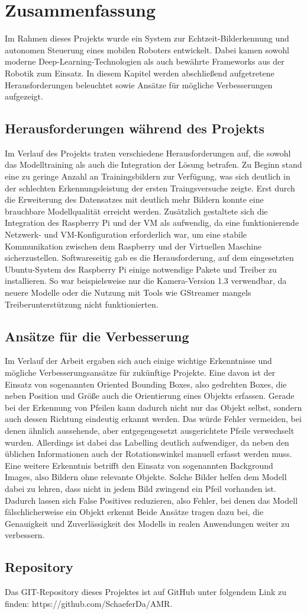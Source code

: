 \section{Zusammenfassung}
Im Rahmen dieses Projekts wurde ein System zur Echtzeit-Bilderkennung und autonomen Steuerung eines mobilen Roboters entwickelt. 
Dabei kamen sowohl moderne Deep-Learning-Technologien als auch bewährte Frameworks aus der Robotik zum Einsatz. 
In diesem Kapitel werden abschließend aufgetretene Herausforderungen beleuchtet sowie Ansätze für mögliche Verbesserungen aufgezeigt.
\subsection{Herausforderungen während des Projekts}
Im Verlauf des Projekts traten verschiedene Herausforderungen auf, die sowohl das Modelltraining als auch die Integration der Lösung betrafen. 
Zu Beginn stand eine zu geringe Anzahl an Trainingsbildern zur Verfügung, was sich deutlich in der schlechten Erkennungsleistung der ersten Traingsversuche zeigte. 
Erst durch die Erweiterung des Datensatzes mit deutlich mehr Bildern konnte eine brauchbare Modellqualität erreicht werden. 
\newPar
Zusätzlich gestaltete sich die Integration des Raspberry Pi und der VM als aufwendig, da eine funktionierende Netzwerk- und VM-Konfiguration erforderlich war, 
um eine stabile Kommunikation zwischen dem Raspberry und der Virtuellen Maschine sicherzustellen. 
\newPar
Softwareseitig gab es die Herausforderung, auf dem eingesetzten Ubuntu-System des Raspberry Pi einige notwendige Pakete und Treiber zu installieren.
So war beispielsweise nur die Kamera-Version 1.3 verwendbar, da neuere Modelle oder die Nutzung mit Tools wie GStreamer mangels Treiberunterstützung nicht funktionierten. 

\subsection{Ansätze für die Verbesserung}
Im Verlauf der Arbeit ergaben sich auch einige wichtige Erkenntnisse und mögliche Verbesserungsansätze für zukünftige Projekte. 
Eine davon ist der Einsatz von sogenannten Oriented Bounding Boxes, also gedrehten Boxes, die neben Position und Größe auch die Orientierung eines Objekts erfassen. 
Gerade bei der Erkennung von Pfeilen kann dadurch nicht nur das Objekt selbst, sondern auch dessen Richtung eindeutig erkannt werden.
\cite{yolo_obb}
Das würde Fehler vermeiden, bei denen ähnlich aussehende, aber entgegengesetzt ausgerichtete Pfeile verwechselt wurden. 
Allerdings ist dabei das Labelling deutlich aufwendiger, da neben den üblichen Informationen auch der Rotationswinkel manuell erfasst werden muss. 
\newPar
Eine weitere Erkenntnis betrifft den Einsatz von sogenannten Background Images, also Bildern ohne relevante Objekte. 
Solche Bilder helfen dem Modell dabei zu lehren, dass nicht in jedem Bild zwingend ein Pfeil vorhanden ist. 
Dadurch lassen sich False Positives reduzieren, also Fehler, bei denen das Modell fälschlicherweise ein Objekt erkennt
\newPar
Beide Ansätze tragen dazu bei, die Genauigkeit und Zuverlässigkeit des Modells in realen Anwendungen weiter zu verbessern.

\subsection{Repository}
Das GIT-Repository dieses Projektes ist auf GitHub unter folgendem Link zu finden: https://github.com/SchaeferDa/AMR.